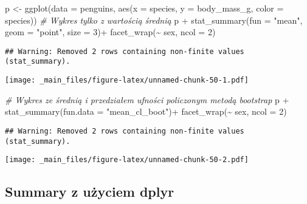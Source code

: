 \documentclass[
]{book}
\newenvironment{Shaded}{\begin{snugshade}}{\end{snugshade}}
\newcommand{\AttributeTok}[1]{\textcolor[rgb]{0.77,0.63,0.00}{#1}}
\newcommand{\CommentTok}[1]{\textcolor[rgb]{0.56,0.35,0.01}{\textit{#1}}}
\newcommand{\DecValTok}[1]{\textcolor[rgb]{0.00,0.00,0.81}{#1}}
\newcommand{\FunctionTok}[1]{\textcolor[rgb]{0.00,0.00,0.00}{#1}}
\newcommand{\NormalTok}[1]{#1}
\newcommand{\OtherTok}[1]{\textcolor[rgb]{0.56,0.35,0.01}{#1}}
\newcommand{\SpecialCharTok}[1]{\textcolor[rgb]{0.00,0.00,0.00}{#1}}
\newcommand{\StringTok}[1]{\textcolor[rgb]{0.31,0.60,0.02}{#1}}
\begin{document}
\begin{Shaded}
\begin{Highlighting}[]
\NormalTok{p }\OtherTok{\textless{}{-}} \FunctionTok{ggplot}\NormalTok{(}\AttributeTok{data =}\NormalTok{ penguins, }\FunctionTok{aes}\NormalTok{(}\AttributeTok{x =}\NormalTok{ species, }\AttributeTok{y =}\NormalTok{ body\_mass\_g, }\AttributeTok{color =}\NormalTok{ species))}
\CommentTok{\# Wykres tylko z wartością średnią}
\NormalTok{p }\SpecialCharTok{+} \FunctionTok{stat\_summary}\NormalTok{(}\AttributeTok{fun =} \StringTok{"mean"}\NormalTok{, }\AttributeTok{geom =} \StringTok{"point"}\NormalTok{, }\AttributeTok{size =} \DecValTok{3}\NormalTok{)}\SpecialCharTok{+}
  \FunctionTok{facet\_wrap}\NormalTok{(}\SpecialCharTok{\textasciitilde{}}\NormalTok{ sex, }\AttributeTok{ncol =} \DecValTok{2}\NormalTok{)}
\end{Highlighting}
\end{Shaded}

\begin{verbatim}
## Warning: Removed 2 rows containing non-finite values (stat_summary).
\end{verbatim}

\texttt{[image: \_main\_files/figure-latex/unnamed-chunk-50-1.pdf]}

\begin{Shaded}
\begin{Highlighting}[]
\CommentTok{\# Wykres ze średnią i przedziałem ufności policzonym metodą bootstrap}
\NormalTok{p }\SpecialCharTok{+} \FunctionTok{stat\_summary}\NormalTok{(}\AttributeTok{fun.data =} \StringTok{"mean\_cl\_boot"}\NormalTok{)}\SpecialCharTok{+}
  \FunctionTok{facet\_wrap}\NormalTok{(}\SpecialCharTok{\textasciitilde{}}\NormalTok{ sex, }\AttributeTok{ncol =} \DecValTok{2}\NormalTok{)}
\end{Highlighting}
\end{Shaded}

\begin{verbatim}
## Warning: Removed 2 rows containing non-finite values (stat_summary).
\end{verbatim}

\texttt{[image: \_main\_files/figure-latex/unnamed-chunk-50-2.pdf]}

\hypertarget{summary-z-uux17cyciem-dplyr}{%
\subsection{Summary z użyciem dplyr}\label{summary-z-uux17cyciem-dplyr}}
\end{document}
